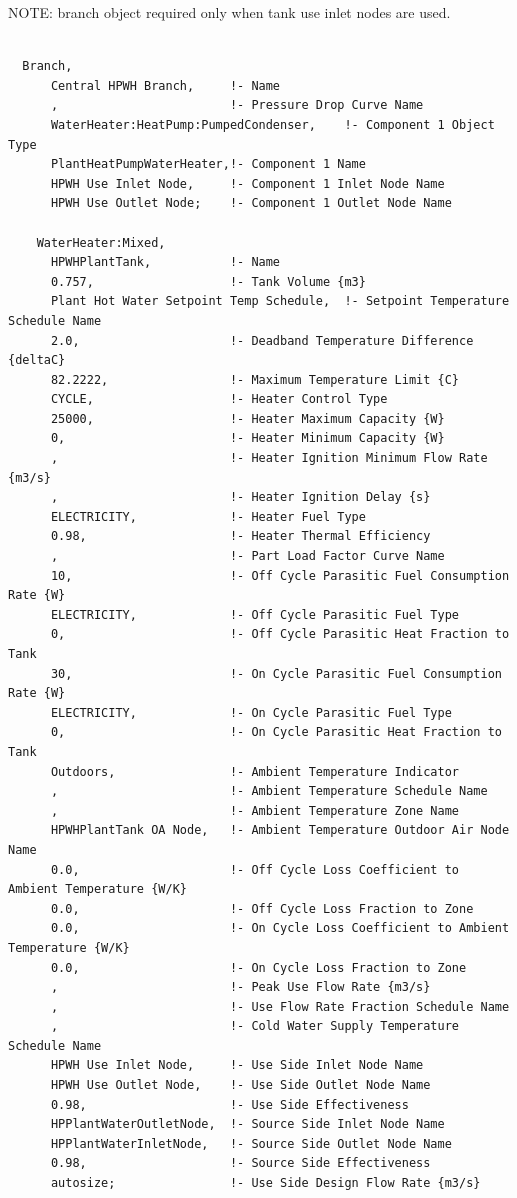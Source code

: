 NOTE: branch object required only when tank use inlet nodes are used.

\begin{lstlisting}

  Branch,
      Central HPWH Branch,     !- Name
      ,                        !- Pressure Drop Curve Name
      WaterHeater:HeatPump:PumpedCondenser,    !- Component 1 Object Type
      PlantHeatPumpWaterHeater,!- Component 1 Name
      HPWH Use Inlet Node,     !- Component 1 Inlet Node Name
      HPWH Use Outlet Node;    !- Component 1 Outlet Node Name

    WaterHeater:Mixed,
      HPWHPlantTank,           !- Name
      0.757,                   !- Tank Volume {m3}
      Plant Hot Water Setpoint Temp Schedule,  !- Setpoint Temperature Schedule Name
      2.0,                     !- Deadband Temperature Difference {deltaC}
      82.2222,                 !- Maximum Temperature Limit {C}
      CYCLE,                   !- Heater Control Type
      25000,                   !- Heater Maximum Capacity {W}
      0,                       !- Heater Minimum Capacity {W}
      ,                        !- Heater Ignition Minimum Flow Rate {m3/s}
      ,                        !- Heater Ignition Delay {s}
      ELECTRICITY,             !- Heater Fuel Type
      0.98,                    !- Heater Thermal Efficiency
      ,                        !- Part Load Factor Curve Name
      10,                      !- Off Cycle Parasitic Fuel Consumption Rate {W}
      ELECTRICITY,             !- Off Cycle Parasitic Fuel Type
      0,                       !- Off Cycle Parasitic Heat Fraction to Tank
      30,                      !- On Cycle Parasitic Fuel Consumption Rate {W}
      ELECTRICITY,             !- On Cycle Parasitic Fuel Type
      0,                       !- On Cycle Parasitic Heat Fraction to Tank
      Outdoors,                !- Ambient Temperature Indicator
      ,                        !- Ambient Temperature Schedule Name
      ,                        !- Ambient Temperature Zone Name
      HPWHPlantTank OA Node,   !- Ambient Temperature Outdoor Air Node Name
      0.0,                     !- Off Cycle Loss Coefficient to Ambient Temperature {W/K}
      0.0,                     !- Off Cycle Loss Fraction to Zone
      0.0,                     !- On Cycle Loss Coefficient to Ambient Temperature {W/K}
      0.0,                     !- On Cycle Loss Fraction to Zone
      ,                        !- Peak Use Flow Rate {m3/s}
      ,                        !- Use Flow Rate Fraction Schedule Name
      ,                        !- Cold Water Supply Temperature Schedule Name
      HPWH Use Inlet Node,     !- Use Side Inlet Node Name
      HPWH Use Outlet Node,    !- Use Side Outlet Node Name
      0.98,                    !- Use Side Effectiveness
      HPPlantWaterOutletNode,  !- Source Side Inlet Node Name
      HPPlantWaterInletNode,   !- Source Side Outlet Node Name
      0.98,                    !- Source Side Effectiveness
      autosize;                !- Use Side Design Flow Rate {m3/s}


\end{lstlisting}
